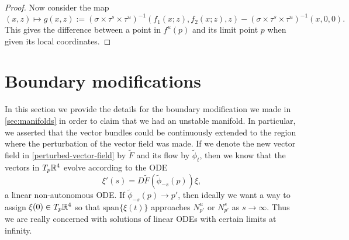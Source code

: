 \begin{proof}
	Now consider the map
	\begin{equation}
		(x,z) \mapsto g(x,z) := (\sigma \times \tau^s \times \tau^u)^{-1}(f_1(x;z) , f_2(x;z), z) - (\sigma \times \tau^s \times \tau^u)^{-1}(x,0,0).
	\end{equation}
	This gives the difference between a point in \(f^u(p)\) and its limit point \(p\) when given its local coordinates. 
\end{proof}
\section{Boundary modifications}\label{sec:boundary-modifications}

In this section we provide the details for the boundary modification we made in \cref{sec:manifolds} in order to claim that we had an unstable manifold. In particular, we asserted that the vector bundles could be continuously extended to the region where the perturbation of the vector field was made. If we denote the new vector field in \cref{perturbed-vector-field} by \(\tilde F\) and its flow by \(\tilde \phi_t\), then we know that the vectors in \(T_p\mathbb{R}^4\) evolve according to the ODE
\begin{equation}\label{flow-tangent-vectors-perturbed}
	\xi'(s) = D\tilde F(\tilde \phi_{-s}(p)) \xi,
\end{equation}
a linear non-autonomous ODE. If \(\tilde \phi_{-s}(p) \to p'\), then ideally we want a way to assign \(\xi(0) \in T_p\mathbb{R}^4\) so that \(\mathrm{span}\{\xi(t)\}\) approaches \(N^u_{p'}\) or \(N^s_{p'}\) as \(s\to \infty\). Thus we are really concerned with solutions of linear ODEs with certain limits at infinity.


